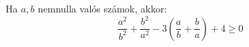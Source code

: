    Ha $a,b$ nemnulla valós számok, akkor:
   $$
   \frac{a^2}{b^2}+\frac{b^2}{a^2}-
   3\left( \frac{a}{b}+\frac{b}{a} \right) +4 \ge 0
   $$
